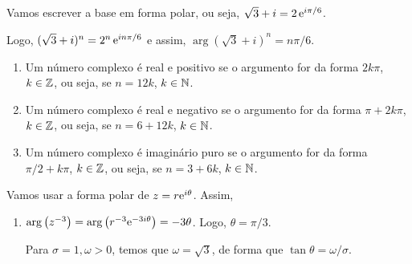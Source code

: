 \begin{questions}
\setcounter{question}{13}
\begin{solution}
Vamos escrever a base em forma polar, ou seja, $\sqrt{3}+i = 2\,\mathrm{e}^{i \pi/6}$.

Logo, $(\sqrt{3}+i)^n = 2^n\,\mathrm{e}^{i n \pi/6}$ e assim, $\arg (\sqrt{3}+i)^n = n \pi/6$.
\begin{enumerate}[label=(\alph*)]
  \item Um número complexo é real e positivo se o argumento for da forma $2k\pi$, $k\in{\mathbb Z}$, ou seja, se $n = 12k$, $k\in{\mathbb N}$.
  \item Um número complexo é real e negativo se o argumento for da forma $\pi + 2k\pi$, $k\in{\mathbb Z}$, ou seja, se $n = 6+12k$, $k\in{\mathbb N}$.
  \item Um número complexo é imaginário puro se o argumento for da forma $\pi/2 + k\pi$, $k\in{\mathbb Z}$, ou seja, se $n = 3+6k$, $k\in{\mathbb N}$.
\end{enumerate}
\end{solution}

\begin{solution}
Vamos usar a forma polar de $z = r \mathrm{e}^{i\theta}$. Assim,
\begin{enumerate}[label=(\alph*)]
  \item 
  $\arg\left(z^{-3}\right) = \arg\left(r^{-3} \mathrm{e}^{-3i\theta}\right) = -3\theta$. Logo, $\theta = \pi/3$.
  
  Para $\sigma = 1, \omega>0$, temos que $\omega = \sqrt{3}$, de forma que $\tan{\theta} = \omega/\sigma$.
  

\end{enumerate}
\end{solution}
\end{questions}
